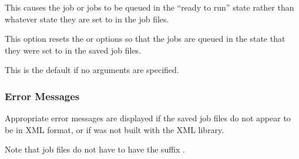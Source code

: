 
This causes the job or jobs to be queued in the ``ready to run'' state rather than whatever state they are set to in the job files.


This option resets the  or  options so that the jobs are queued in the state that they were set
to in the saved job files.

This is the default if no arguments are specified.


\subsubsection{Error Messages}

Appropriate error messages are displayed if the saved job files do not appear to be in XML format, or if \ProductName{} was not built
with the XML library.

Note that job files do not have to have the suffix \batchjobsuffix.


